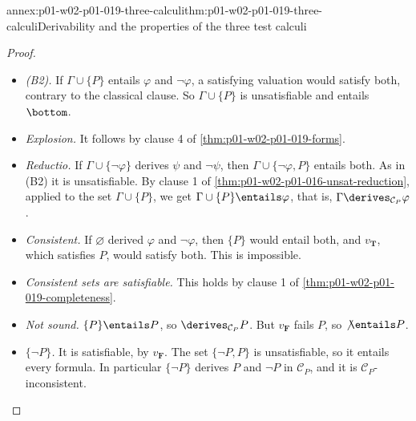 \begin{annexitem}{annex:p01-w02-p01-019-three-calculi}{thm:p01-w02-p01-019-three-calculi}{Derivability and the properties of the three test calculi}
\begin{proof}
\begin{itemize}
        for every \(\psi\).
  \item \emph{(B2).} If \(\Gamma\cup\{P\}\) entails \(\varphi\) and
        \(\neg\varphi\), a satisfying valuation would satisfy both,
        contrary to the classical clause. So \(\Gamma\cup\{P\}\) is
        unsatisfiable and entails \(\bottom\).
  \item \emph{Explosion.} It follows by clause 4 of
        \cref{thm:p01-w02-p01-019-forms}.
  \item \emph{Reductio.} If \(\Gamma\cup\{\neg\varphi\}\) derives \(\psi\)
        and \(\neg\psi\), then \(\Gamma\cup\{\neg\varphi,P\}\) entails both.
        As in (B2) it is unsatisfiable. By clause 1 of
        \cref{thm:p01-w02-p01-016-unsat-reduction}, applied to the set
        \(\Gamma\cup\{P\}\), we get \(\Gamma\cup\{P\}\entails\varphi\), that
        is, \(\Gamma\derives_{\mathcal C_P}\varphi\).
  \item \emph{Consistent.} If \(\varnothing\) derived \(\varphi\) and
        \(\neg\varphi\), then \(\{P\}\) would entail both, and
        \(v_{\mathbf T}\), which satisfies \(P\), would satisfy both. This
        is impossible.
  \item \emph{Consistent sets are satisfiable.} This holds by clause 1 of
        \cref{thm:p01-w02-p01-019-completeness}.
  \item \emph{Not sound.} \(\{P\}\entails P\), so
        \(\derives_{\mathcal C_P}P\). But \(v_{\mathbf F}\) fails \(P\), so
        \(\not\entails P\).
  \item \emph{\(\{\neg P\}\).} It is satisfiable, by \(v_{\mathbf F}\). The
        set \(\{\neg P,P\}\) is unsatisfiable, so it entails every formula.
        In particular \(\{\neg P\}\) derives \(P\) and \(\neg P\) in
        \(\mathcal C_P\), and it is \(\mathcal C_P\)-inconsistent.
\end{itemize}
\end{proof}
\end{annexitem}

